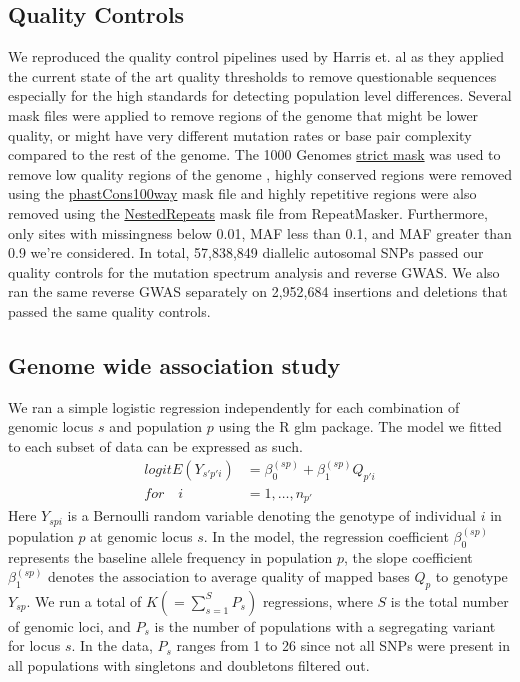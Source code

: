 \documentclass[9pt,lineno]{elife}
\begin{document}
\subsection{Quality Controls}
We reproduced the quality control pipelines used by Harris et. al as they applied the current state of the art quality thresholds to remove questionable sequences especially for the high standards for detecting population level differences. 
Several mask files were applied to remove regions of the genome that might be lower quality, or might have very different mutation rates or base pair complexity compared to the rest of the genome. 
The  1000 Genomes \href{http://ftp.1000genomes.ebi.ac.uk/vol1/ftp/release/20130502/supporting/accessible_genome_masks/20141020.strict_mask.whole_genome.bed}{strict mask} was used to remove low quality regions of the genome , highly conserved regions were removed using the \href{http://hgdownload.cse.ucsc.edu/goldenPath/hg19/database/phastConsElements100way.txt.gz}{phastCons100way} mask file and highly repetitive regions were also removed using the \href{http://hgdownload.cse.ucsc.edu/goldenpath/hg19/database/nestedRepeats.txt.gz}{NestedRepeats} mask file from RepeatMasker. 
Furthermore, only sites with missingness below 0.01, MAF less than 0.1, and MAF greater than 0.9 we're considered.
In total, 57,838,849 diallelic autosomal SNPs passed our quality controls for the mutation spectrum analysis and reverse GWAS. 
We also ran the same reverse GWAS separately on 2,952,684 insertions and deletions that passed the same quality controls.

\subsection{Genome wide association study}
We ran a simple logistic regression independently for each combination of genomic locus $s$ and population $p$ using the R glm package\citep{RDevelopmentCoreTeam2016}. The model we fitted to each subset of data can be expressed as such.
\begin{align*}
{logit}{E(Y_{s'p'i})} &= \beta_{0}^{(sp)} + \beta_{1}^{(sp)} Q_{p'i}
\\
\textit{for}\quad i &= 1,\hdots, n_{p'}
\end{align*}
Here $Y_{spi}$ is a Bernoulli random variable denoting the genotype of individual $i$ in population $p$ at genomic locus $s$. 
In the model, the regression coefficient $\beta_{0}^{(sp)}$ represents the baseline allele frequency in population $p$, the slope coefficient $\beta_{1}^{(sp)}$ denotes the association to average quality of mapped bases $Q_{p}$ to genotype $Y_{sp}$. 
We run a total of $K (= \sum_{s=1}^S P_s)$ regressions, where $S$ is the total number of genomic loci, and $P_s$ is the number of populations with a segregating variant for locus $s$. 
In the data, $P_s$ ranges from 1 to 26 since not all SNPs were present in all populations with singletons and doubletons filtered out.
\end{document}
